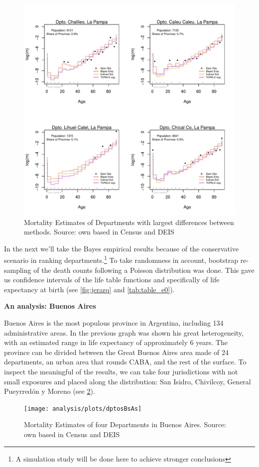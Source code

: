 \documentclass[12pt,]{article}
\begin{document}
\begin{figure}

{\centering \includegraphics[width=0.7\linewidth]{analysis/plots/AjusteFeos} 

}

\caption{Mortality Estimates of Departments with largest differences between methods. Source: own based in Census and DEIS}\label{fig:Feos}
\end{figure}

In the next we'll take the Bayes empirical results because of the
conservative scenario in ranking departments.\footnote{A simulation
  study will be done here to achieve stronger conclusions} To take
randomness in account, bootstrap re-sampling of the death counts
following a Poisson distribution was done. This gave us confidence
intervals of the life table functions and specifically of life
expectancy at birth (see \ref{fig:jerarq} and \ref{tab:table_e0}).

\textbf{An analysis: Buenos Aires}

Buenos Aires is the most populous province in Argentina, including 134
administrative areas. In the previous graph was shown his great
heterogeneity, with an estimated range in life expectancy of
approximately 6 years. The province can be divided between the Great
Buenos Aires area made of 24 departments, an urban area that rounds
CABA, and the rest of the surface. To inspect the meaningful of the
results, we can take four jurisdictions with not small exposures and
placed along the distribution: San Isidro, Chivilcoy, General Pueyrredón
y Moreno (see \ref{fig:dptosBsAs}).

\begin{figure}

{\centering \texttt{[image: analysis/plots/dptosBsAs]} 

}

\caption{Mortality Estimates of four Departments in Buenos Aires. Source: own based in Census and DEIS}\label{fig:dptosBsAs}
\end{figure}
\end{document}
